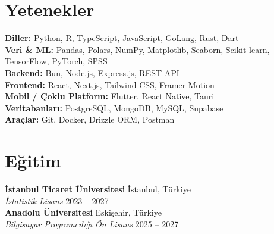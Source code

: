 \documentclass[10pt,a4paper]{extarticle}
\begin{document}
\section{Yetenekler}
\textbf{Diller:} Python, R, TypeScript, JavaScript, GoLang, Rust, Dart \\
\textbf{Veri \& ML:} Pandas, Polars, NumPy, Matplotlib, Seaborn, Scikit-learn, TensorFlow, PyTorch, SPSS \\
\textbf{Backend:} Bun, Node.js, Express.js, REST API \\
\textbf{Frontend:} React, Next.js, Tailwind CSS, Framer Motion \\
\textbf{Mobil / Çoklu Platform:} Flutter, React Native, Tauri \\
\textbf{Veritabanları:} PostgreSQL, MongoDB, MySQL, Supabase \\
\textbf{Araçlar:} Git, Docker, Drizzle ORM, Postman
\section{Eğitim}
\textbf{İstanbul Ticaret Üniversitesi} \hfill İstanbul, Türkiye\\
\textit{İstatistik Lisans} \hfill 2023 -- 2027\\
\textbf{Anadolu Üniversitesi} \hfill Eskişehir, Türkiye\\
\textit{Bilgisayar Programcılığı Ön Lisans} \hfill 2025 -- 2027\\
\end{document}
